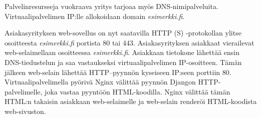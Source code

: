     Palvelinresursseja vuokraava yritys tarjoaa myös DNS-nimipalveluita. Virtuaalipalvelimen IP:lle allokoidaan domain \textit{esimerkki.fi}.

    Asiakasyrityksen web-sovellus on nyt saatavilla HTTP (S) -protokollan ylitse osoitteesta \textit{esimerkki.fi} portista 80 tai 443. Asiakasyrityksen asiakkaat vierailevat web-selaimellaan osoitteessa \textit{esimerkki.fi}. Asiakkaan tietokone lähettää ensin DNS-tiedustelun ja saa vastaukseksi virtuaalipalvelimen IP-osoitteen. Tämän jälkeen web-selain lähettää HTTP–pyynnön kyseiseen IP:seen porttiin 80. Virtuaalipalvelimella pyörivä Nginx välittää pyynnön Djangon HTTP-palvelimelle, joka vastaa pyyntöön HTML-koodilla. Nginx välittää tämän HTML:n takaisin asiakkaan web-selaimelle ja web-selain renderöi HTML-koodista web-sivuston.
